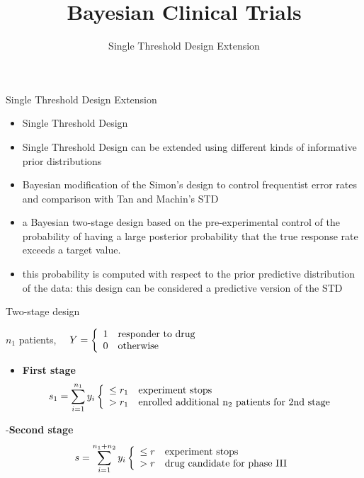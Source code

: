 \documentclass{beamer}
\title[]{Bayesian Clinical Trials}
\subtitle{Single Threshold Design Extension}
\date{}
\begin{document}
\begin{frame}
\titlepage %
\end{frame}


\begin{frame}{Single Threshold Design Extension}

\begin{itemize}[<+->]
\itemsep1pt\parskip0pt
\item
  Single Threshold Design
\item
  Single Threshold Design can be extended using different kinds of
  informative prior distributions
\item
  Bayesian modification of the Simon's design to control frequentist
  error rates and comparison with Tan and Machin's STD
\item
  a Bayesian two-stage design based on the pre-experimental control of
  the probability of having a large posterior probability that the true
  response rate exceeds a target value.
\item
  this probability is computed with respect to the prior predictive
  distribution of the data: this design can be considered a predictive
  version of the STD
\end{itemize}

\end{frame}

\begin{frame}{Two-stage design}

\(n_1\) patients,
\(\quad Y=\left\{\begin{array}{ll} 1 & \rm{responder\ to\ drug}\\ 0 & \rm{otherwise}\end{array}\right.\)

\begin{itemize}
\itemsep1pt\parskip0pt
\item
  \textbf{First stage} \[
  s_1=\sum_{i=1}^{n_1} y_i \left\{\begin{array}{ll}\leq r_1 & \rm{experiment\ stops}\\
  >r_1 & \rm{enrolled\ additional}\ n_2  \rm{\ patients \ for\ 2nd\ stage}\end{array}\right.
  \]
\end{itemize}

-\textbf{Second stage} \[
s=\sum_{i=1}^{n_1+n_2}y_i\left\{\begin{array}{ll}\leq r & \rm{experiment\ stops}\\
    >r & \rm{drug\ candidate\ for\ phase\ III}
\end{array}\right.
\]

\end{frame}
\end{document}

